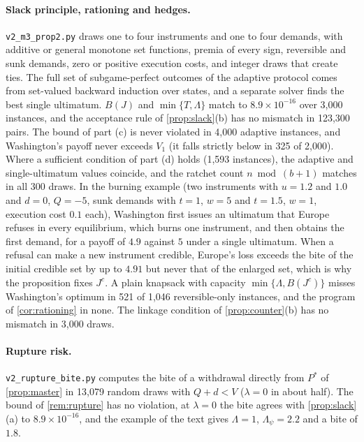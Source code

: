 \paragraph{Slack principle, rationing and hedges.} \texttt{v2\_m3\_prop2.py} draws one to four instruments and one to four demands, with additive or general monotone set functions, premia of every sign, reversible and sunk demands, zero or positive execution costs, and integer draws that create ties. The full set of subgame-perfect outcomes of the adaptive protocol comes from set-valued backward induction over states, and a separate solver finds the best single ultimatum. $B(J)$ and $\min\{T,\Lambda\}$ match to $8.9\times10^{-16}$ over 3,000 instances, and the acceptance rule of \cref{prop:slack}(b) has no mismatch in 123,300 pairs. The bound of part (c) is never violated in 4,000 adaptive instances, and Washington's payoff never exceeds $V_1$ (it falls strictly below in 325 of 2,000). Where a sufficient condition of part (d) holds (1,593 instances), the adaptive and single-ultimatum values coincide, and the ratchet count $n\bmod(b+1)$ matches in all 300 draws. In the burning example (two instruments with $u=1.2$ and $1.0$ and $d=0$, $Q=-5$, sunk demands with $t=1$, $w=5$ and $t=1.5$, $w=1$, execution cost $0.1$ each), Washington first issues an ultimatum that Europe refuses in every equilibrium, which burns one instrument, and then obtains the first demand, for a payoff of $4.9$ against $5$ under a single ultimatum. When a refusal can make a new instrument credible, Europe's loss exceeds the bite of the initial credible set by up to $4.91$ but never that of the enlarged set, which is why the proposition fixes $J^c$. A plain knapsack with capacity $\min\{\Lambda,B(J^c)\}$ misses Washington's optimum in 521 of 1,046 reversible-only instances, and the program of \cref{cor:rationing} in none. The linkage condition of \cref{prop:counter}(b) has no mismatch in 3,000 draws.

\paragraph{Rupture risk.} \texttt{v2\_rupture\_bite.py} computes the bite of a withdrawal directly from $P^*$ of \cref{prop:master} in 13,079 random draws with $Q+d<V$ ($\lambda=0$ in about half). The bound of \cref{rem:rupture} has no violation, at $\lambda=0$ the bite agrees with \cref{prop:slack}(a) to $8.9\times10^{-16}$, and the example of the text gives $\Lambda=1$, $\Lambda_\psi=2.2$ and a bite of $1.8$.

